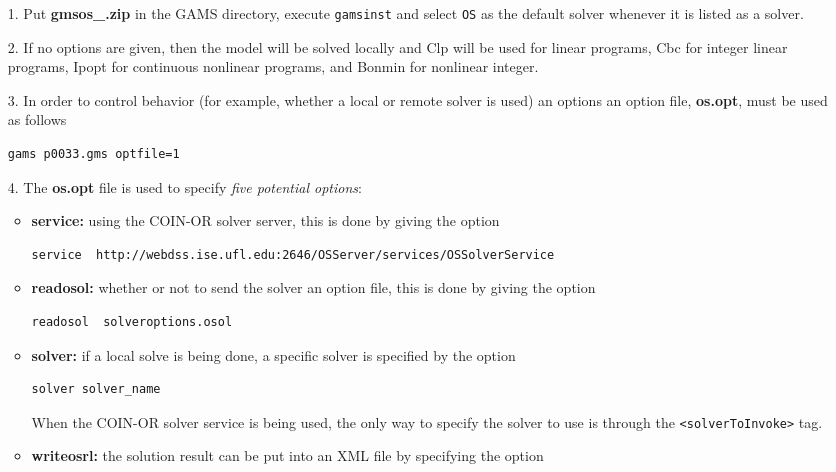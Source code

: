 \documentclass[11pt]{article}
\renewcommand{\{}{{\char"7B}}
\renewcommand{\}}{{\char"7D}}
\renewcommand{\^}{{\char"0D}}
\renewcommand{\'}{{\char"0D}}
\begin{document}
\begin{enumerate}

\item[1.]   Put {\bf gmsos\_.zip} in the GAMS directory, execute  {\tt gamsinst} and select {\tt OS}  as the default solver whenever it is listed as a solver.

\item[2.]   If no options are given, then the model will be solved locally and Clp will be used for linear programs, Cbc for integer linear programs, Ipopt for continuous nonlinear programs, and Bonmin for nonlinear integer.

\item[3.] In order to control behavior (for example, whether a local or remote solver is used) an options an option file, {\bf os.opt}, must be used as follows

\begin{verbatim}
gams p0033.gms optfile=1
\end{verbatim}

\item[4.]  The {\bf os.opt} file is used to specify {\it five potential options}:


\begin{itemize}
\item {\bf service:} using the COIN-OR solver server, this is done by giving the option

\begin{verbatim}
service  http://webdss.ise.ufl.edu:2646/OSServer/services/OSSolverService
\end{verbatim}


\item  {\bf readosol:} whether or not to send the solver an option file, this is done by giving the option
\begin{verbatim}
readosol  solveroptions.osol
\end{verbatim}


\item   {\bf solver:} if a local solve is being done,  a specific solver is specified by the option
\begin{verbatim}
solver solver_name
\end{verbatim}

When the COIN-OR solver service is being used, the only way to specify the solver to use is through the {\tt <solverToInvoke>} tag.


\item  {\bf writeosrl:}  the solution result can be put into an XML file by specifying the option


\end{itemize}
\end{enumerate}
\end{document}
